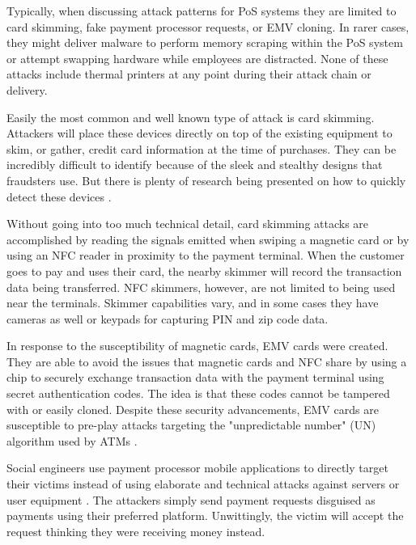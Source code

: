 Typically, when discussing attack patterns for PoS systems they are limited to card skimming, fake payment processor requests, or EMV cloning. In rarer cases, they might deliver malware to perform memory scraping within the PoS system or attempt swapping hardware while employees are distracted. None of these attacks include thermal printers at any point during their attack chain or delivery.


Easily the most common and well known type of attack is card skimming. Attackers will place these devices directly on top of the existing equipment to skim, or gather, credit card information at the time of purchases. They can be incredibly difficult to identify because of the sleek and stealthy designs that fraudsters use. But there is plenty of research being presented on how to quickly detect these devices \autocite{scaifeFearReaperCharacterization2018,scaifeKissRogueEvaluating2019a}.

Without going into too much technical detail, card skimming attacks are accomplished by reading the signals emitted when swiping a magnetic card or by using an NFC reader in proximity to the payment terminal. When the customer goes to pay and uses their card, the nearby skimmer will record the transaction data being transferred. NFC skimmers, however, are not limited to being used near the terminals. Skimmer capabilities vary, and in some cases they have cameras as well or keypads for capturing PIN and zip code data.

In response to the susceptibility of magnetic cards, EMV cards were created. They are able to avoid the issues that magnetic cards and NFC share by using a chip to securely exchange transaction data with the payment terminal using secret authentication codes. The idea is that these codes cannot be tampered with or easily cloned. Despite these security advancements, EMV cards are susceptible to pre-play attacks targeting the "unpredictable number" (UN) algorithm used by ATMs \autocite{bondChipSkimCloning2014}.




Social engineers use payment processor mobile applications to directly target their victims instead of using elaborate and technical attacks against servers or user equipment \autocite{bejuFraudsBankingSystem2023}. The attackers simply send payment requests disguised as payments using their preferred platform. Unwittingly, the victim will accept the request thinking they were receiving money instead.

